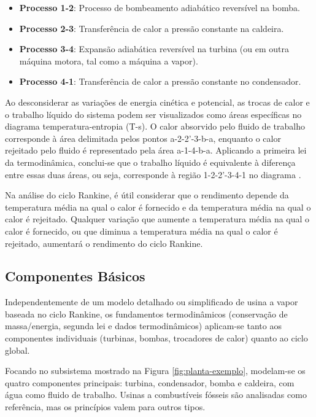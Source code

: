 \documentclass[
	article,			%
	11pt,				%
	oneside,			%
	a4paper,			%
	english,			%
	brazil,				%
	sumario=tradicional
	]{abntex2}
\begin{document}
\begin{itemize}
	\item \textbf{Processo 1-2}: Processo de bombeamento adiabático reversível na bomba.
	\item \textbf{Processo 2-3}: Transferência de calor a pressão constante na caldeira.
	\item \textbf{Processo 3-4}: Expansão adiabática reversível na turbina (ou em outra máquina motora, tal como a máquina a vapor).
	\item \textbf{Processo 4-1}: Transferência de calor a pressão constante no condensador.
\end{itemize}

Ao desconsiderar as variações de energia cinética e potencial, as trocas de calor e o trabalho líquido do sistema podem ser visualizados como áreas específicas no diagrama temperatura-entropia (T-s). O calor absorvido pelo fluido de trabalho corresponde à área delimitada pelos pontos a-2-2'-3-b-a, enquanto o calor rejeitado pelo fluido é representado pela área a-1-4-b-a. Aplicando a primeira lei da termodinâmica, conclui-se que o trabalho líquido é equivalente à diferença entre essas duas áreas, ou seja, corresponde à região 1-2-2'-3-4-1 no diagrama \cite{borgnakke-2020}.

Na análise do ciclo Rankine, é útil considerar que o rendimento depende da temperatura média na qual o calor é fornecido e da temperatura média na qual o calor é rejeitado. Qualquer variação que aumente a temperatura média na qual o calor é fornecido, ou que diminua a temperatura média na qual o calor é rejeitado, aumentará o rendimento do ciclo Rankine.

\subsection{Componentes Básicos}

Independentemente de um modelo detalhado ou simplificado de usina a vapor baseada no ciclo Rankine, os fundamentos termodinâmicos (conservação de massa/energia, segunda lei e dados termodinâmicos) aplicam-se tanto aos componentes individuais (turbinas, bombas, trocadores de calor) quanto ao ciclo global.

Focando no subsistema mostrado na Figura \ref{fig:planta-exemplo}, modelam-se os quatro componentes principais: turbina, condensador, bomba e caldeira, com água como fluido de trabalho. Usinas a combustíveis fósseis são analisadas como referência, mas os princípios valem para outros tipos.
\end{document}
